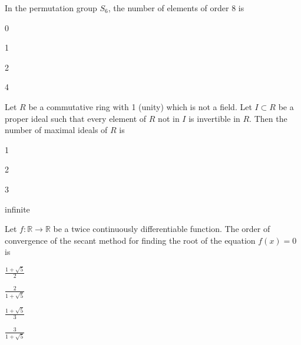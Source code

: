 \item  In the permutation group $ S_6 $, the number of elements of order 8 is
\begin{enumerate}
\begin{multicols}{4}
    \item 0 
    \item 1 
    \item 2 
    \item 4 
    \end{multicols}
\end{enumerate}
\bigskip

\item  Let $ R $ be a commutative ring with 1 (unity) which is not a field. Let $ I \subset R $ be a proper ideal such that every element of $ R $ not in $ I $ is invertible in $ R $. Then the number of maximal ideals of $ R $ is 
\begin{enumerate}
\begin{multicols}{4}
    \item 1 
    \item 2 
    \item 3 
    \item infinite 
    \end{multicols}
\end{enumerate}

\bigskip

\item  Let $ f : \mathbb{R} \to \mathbb{R} $ be a twice continuously differentiable function. The order of convergence of the secant method for finding the root of the equation $ f(x) = 0 $ is 
\begin{enumerate}
\begin{multicols}{4}
    \item $ \frac{1 + \sqrt{5}}{2} $ 
    \item $ \frac{2}{1 + \sqrt{5}} $ 
    \item $ \frac{1 + \sqrt{5}}{3} $ 
    \item $ \frac{3}{1 + \sqrt{5}} $ 
    \end{multicols}
\end{enumerate}

\bigskip

